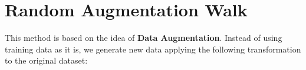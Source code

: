 
\section{Random Augmentation Walk}

This method is based on the idea of \textbf{Data Augmentation}. Instead of using training data as it is, we generate new data applying the following transformation to the original dataset:



